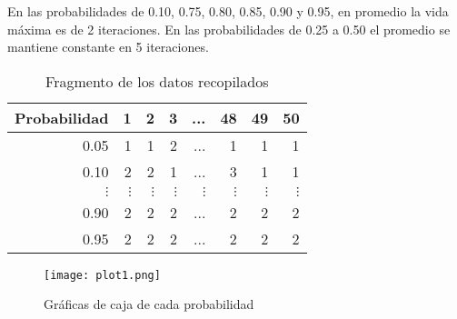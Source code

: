 \documentclass[12pt,letterpaper]{article}
\begin{document}
 En las probabilidades de 0.10, 0.75, 0.80, 0.85, 0.90 y 0.95, en promedio la vida máxima es de 2 iteraciones. En las probabilidades de 0.25 a 0.50 el promedio se mantiene constante en 5 iteraciones.
 
 \begin{table}
\centering
\caption{Fragmento de los datos recopilados}
\begin{tabular}{rrrrrrrr}
\hline 
Probabilidad & 1 & 2 & 3 & ... & 48 & 49 & 50 \\ 
\hline 
0.05 & 1 & 1 & 2 & ... & 1 & 1 & 1 \\ 
0.10 & 2 & 2 & 1 & ... & 3 & 1 & 1 \\ 
$\vdots$ & $\vdots$ & $\vdots$ & $\vdots$ & $\vdots$ & $\vdots$ & $\vdots$ & $\vdots$ \\ 
0.90 & 2 & 2 & 2 & ... & 2 & 2 & 2 \\ 
 0.95 & 2 & 2 & 2 & ... & 2 & 2 & 2 \\  
\hline
\end{tabular} 
\label{vmdatos}
\end{table}

\begin{figure}
\centering
 \texttt{[image: plot1.png]}
 \caption{Gráficas de caja de cada probabilidad}
 \label{vida}
\end{figure}


 


\end{document}
